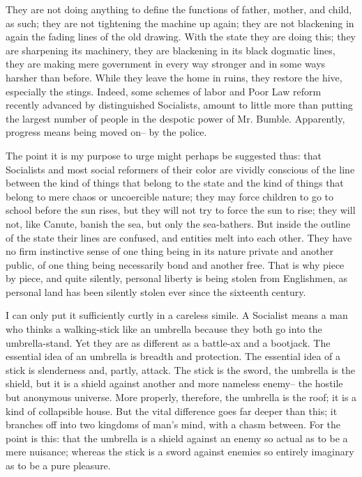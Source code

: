 \documentclass[final,10pt,letterpaper,twocolumn,openany]{book}
\begin{document}
They are not doing anything to
define the functions of father, mother, and child, as such; they are not
tightening the machine up again; they are not blackening in again the
fading lines of the old drawing. With the state they are doing this; they are
sharpening its machinery, they are blackening in its black dogmatic lines,
they are making mere government in every way stronger and in some
ways harsher than before. While they leave the home in ruins, they restore
the hive, especially the stings. Indeed, some schemes of labor and Poor
Law reform recently advanced by distinguished Socialists, amount to little
more than putting the largest number of people in the despotic power of
Mr. Bumble. Apparently, progress means being moved on-- by the police.

The point it is my purpose to urge might perhaps be suggested thus:
that Socialists and most social reformers of their color are vividly
conscious of the line between the kind of things that belong to the state
and the kind of things that belong to mere chaos or uncoercible nature;
they may force children to go to school before the sun rises, but they will
not try to force the sun to rise; they will not, like Canute, banish the sea,
but only the sea-bathers. But inside the outline of the state their lines are
confused, and entities melt into each other. They have no firm instinctive
sense of one thing being in its nature private and another public, of one
thing being necessarily bond and another free. That is why piece by piece,
and quite silently, personal liberty is being stolen from Englishmen, as
personal land has been silently stolen ever since the sixteenth century.

I can only put it sufficiently curtly in a careless simile. A Socialist
means a man who thinks a walking-stick like an umbrella because they
both go into the umbrella-stand. Yet they are as different as a battle-ax and
a bootjack. The essential idea of an umbrella is breadth and protection.
The essential idea of a stick is slenderness and, partly, attack. The stick is
the sword, the umbrella is the shield, but it is a shield against another and
more nameless enemy-- the hostile but anonymous universe. More
properly, therefore, the umbrella is the roof; it is a kind of collapsible
house. But the vital difference goes far deeper than this; it branches off
into two kingdoms of man's mind, with a chasm between. For the point is
this: that the umbrella is a shield against an enemy so actual as to be a
mere nuisance; whereas the stick is a sword against enemies so entirely
imaginary as to be a pure pleasure. 
\end{document}

